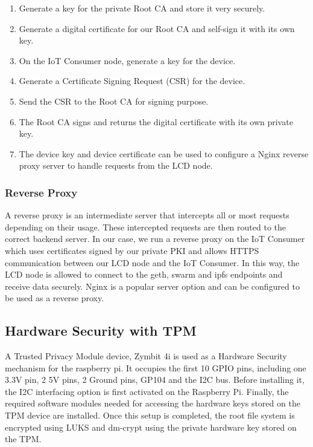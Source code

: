 \documentclass[11pt,openright]{report}
\begin{document}
\begin{enumerate}
	\item Generate a key for the private Root CA and store it very securely.
	\item Generate a digital certificate for our Root CA and self-sign it with its own key.
	\item On the IoT Consumer node, generate a key for the device.
	\item Generate a Certificate Signing Request (CSR) for the device.
	\item Send the CSR to the Root CA for signing purpose.
	\item The Root CA signs and returns the digital certificate with its own private key.
	\item The device key and device certificate can be used to configure a Nginx reverse proxy server to handle requests from the LCD node.
\end{enumerate}


\subsubsection{Reverse Proxy}
A reverse proxy is an intermediate server that intercepts all or most requests depending on their usage. These intercepted requests are then routed to the correct backend server. In our case, we run a reverse proxy on the IoT Consumer which uses certificates signed by our private PKI and allows HTTPS communication between our LCD node and the IoT Consumer. In this way, the LCD node is allowed to connect to the geth, swarm and ipfs endpoints and receive data securely. Nginx is a popular server option and can be configured to be used as a reverse proxy.

\subsection{Hardware Security with TPM}
A Trusted Privacy Module device, Zymbit 4i is used as a Hardware Security mechanism for the raspberry pi. It occupies the first 10 GPIO pins, including one 3.3V pin, 2 5V pins, 2 Ground pins, GP104 and the I2C bus. Before installing it, the I2C interfacing option is first activated on the Raspberry Pi. Finally, the required software modules needed for accessing the hardware keys stored on the TPM device are installed. Once this setup is completed, the root file system is encrypted using LUKS and dm-crypt using the private hardware key stored on the TPM.
\end{document}

